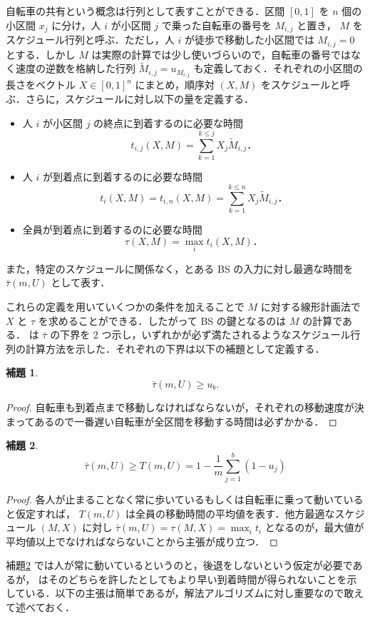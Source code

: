 \documentclass[11pt,a4paper]{jarticle}
\newtheorem{lemma}{補題}
\newcommand\lemref[1]{補題\ref{lemma:#1}}
\begin{document}
自転車の共有という概念は行列として表すことができる．区間 $[0, 1]$ を $n$ 個の小区間 $x_j$ に分け，人 $i$ が小区間 $j$ で乗った自転車の番号を $M_{i,j}$ と置き， $M$ をスケジュール行列と呼ぶ．ただし，人 $i$ が徒歩で移動した小区間では $M_{i,j} = 0$ とする．しかし $M$ は実際の計算では少し使いづらいので，自転車の番号ではなく速度の逆数を格納した行列 $\widetilde{M}_{i, j} = u_{M_{i, j}}$ も定義しておく．それぞれの小区間の長さをベクトル $X \in [0, 1]^{n}$ にまとめ，順序対 $(X, M)$ をスケジュールと呼ぶ．さらに，スケジュールに対し以下の量を定義する．
\begin{itemize}
  \item 人 $i$ が小区間 $j$ の終点に到着するのに必要な時間
  \[
    t_{i,j}(X, M) = \sum_{k = 1}^{k \leq j} X_j \widetilde M_{i, j}．
  \]
\item 人 $i$ が到着点に到着するのに必要な時間
  \[
    t_i(X, M) = t_{i,n}(X, M) = \sum_{k = 1}^{k \leq n} X_j \widetilde M_{i, j}．
  \]
\item 全員が到着点に到着するのに必要な時間
  \[
    \tau(X, M) = \max_{i} t_i(X, M)．
  \]
\end{itemize}
また，特定のスケジュールに関係なく，とある BS の入力に対し最適な時間を $\bar\tau(m, U)$ として表す．

これらの定義を用いていくつかの条件を加えることで $M$ に対する線形計画法で $X$ と $\tau$ を求めることができる．したがって BS の鍵となるのは $M$ の計算である． \textcite{czyzowicz} は $\bar\tau$ の下界を 2 つ示し，いずれかが必ず満たされるようなスケジュール行列の計算方法を示した．それぞれの下界は以下の補題として定義する．

\begin{lemma}
  \begin{equation}
    \bar\tau(m, U) \geq u_b.
  \end{equation}
\end{lemma}
\begin{proof}
  自転車も到着点まで移動しなければならないが，それぞれの移動速度が決まってあるので一番遅い自転車が全区間を移動する時間は必ずかかる．
\end{proof}

\begin{lemma}\label{lemma:lower-bound-bs}
  \begin{equation}
    \bar\tau(m, U) \geq T(m, U) = 1 - \frac{1}{m}\sum_{j = 1}^b(1 - u_j)
  \end{equation}
\end{lemma}
\begin{proof}
  各人が止まることなく常に歩いているもしくは自転車に乗って動いていると仮定すれば， $T(m, U)$ は全員の移動時間の平均値を表す．他方最適なスケジュール $(M, X)$ に対し $\bar\tau(m, U) = \tau(M, X) = \max_i t_i$ となるのが，最大値が平均値以上でなければならないことから主張が成り立つ．
\end{proof}
\lemref{lower-bound-bs} では人が常に動いているというのと，後退をしないという仮定が必要であるが，\textcite{czyzowicz} はそのどちらを許したとしてもより早い到着時間が得られないことを示している．以下の主張は簡単であるが，解法アルゴリズムに対し重要なので敢えて述べておく．
\end{document}
